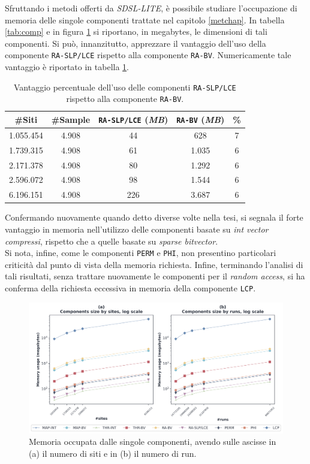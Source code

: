 Sfruttando i metodi offerti da \textit{SDSL-LITE}, è possibile studiare
l'occupazione di memoria delle singole componenti trattate nel capitolo
\ref{metchap}. 
In tabella \ref{tab:comp} e in figura \ref{fig:comp}
si riportano, in megabytes, 
le dimensioni di tali componenti. Si può,
innanzitutto, apprezzare il vantaggio dell'uso della componente
\texttt{RA-SLP/LCE} rispetto alla 
componente \texttt{RA-BV}. Numericamente tale vantaggio è riportato in tabella
\ref{tab:slppanel}.
\begin{table}
  \centering
  \caption{Vantaggio percentuale dell'uso delle componenti \texttt{RA-SLP/LCE}
    rispetto alla componente \texttt{RA-BV}.}
  \begin{tabular}{c|c|c|c|c}
    \textbf{\#Siti} & \textbf{\#Sample} & \textbf{\texttt{RA-SLP/LCE}
                                          (\textit{MB})}
    & \textbf{\texttt{RA-BV} (\textit{MB})} & \textbf{\%}\\
    \hline
    1.055.454 & 4.908 & 44 & 628 & 7\\
    1.739.315 & 4.908 & 61 & 1.035 & 6\\
    2.171.378 & 4.908 & 80 & 1.292 & 6\\
    2.596.072 & 4.908 & 98 & 1.544 & 6\\
    6.196.151 & 4.908 & 226 & 3.687 & 6\\
  \end{tabular}
  \label{tab:slppanel}
\end{table}
Confermando nuovamente quando detto diverse volte nella tesi, si segnala il
forte vantaggio in memoria nell'utilizzo delle componenti basate su \textit{int
  vector compressi}, rispetto che a quelle basate su \textit{sparse
  bitvector}.\\
Si nota, infine, come le componenti \texttt{PERM} e \texttt{PHI}, non
presentino particolari criticità dal punto di vista della memoria
richiesta. Infine, terminando l'analisi di tali risultati, senza trattare
nuovamente le componenti per il \textit{random access}, si ha conferma della
richiesta eccessiva in memoria della componente \texttt{LCP}.
\begin{figure}
  \centering
    \includegraphics[width=\linewidth]{img/comp_mem.png}
  \caption{Memoria occupata dalle singole componenti, avendo sulle ascisse in
    (a) il numero di siti e in (b) il numero di run. }
  \label{fig:comp}
\end{figure}
